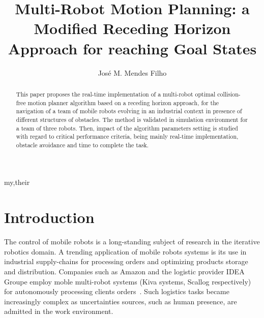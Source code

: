 \documentclass[eprint]{actapoly}
\begin{document}
\title[Trajectory Generation Approach]
{Multi-Robot Motion Planning: a Modified Receding Horizon Approach for reaching Goal States}

\author[J. M. Mendes Filho]{Jos\'{e} M. Mendes Filho}{my,their}


\begin{abstract}

This paper proposes the real-time implementation of a multi-robot optimal collision-free motion planner algorithm based on a receding horizon approach, for the navigation of a team of mobile robots evolving in an industrial context in presence of different structures of obstacles. The method is validated in simulation environment for a team of three robots. Then, impact of the algorithm parameters setting is studied with regard to critical performance criteria, being mainly real-time implementation, obstacle avoidance and time to complete the task.
 
\end{abstract}


\maketitle




\section{Introduction}\label{sec:intro}






The %
control of mobile robots is a long-standing subject of research 
in the iterative robotics domain. A trending application of mobile robots systems
is its use in industrial supply-chains for processing orders and optimizing products storage and distribution. Companies such as Amazon and the logistic provider IDEA Groupe employ moble multi-robot systems (Kiva systems, Scallog respectively) for autonomously processing clients orders~\cite{Gizmag,supplychain}.
Such logistics tasks became increasingly complex as uncertainties sources, such as human presence, are admitted in the work environment.
\end{document}
